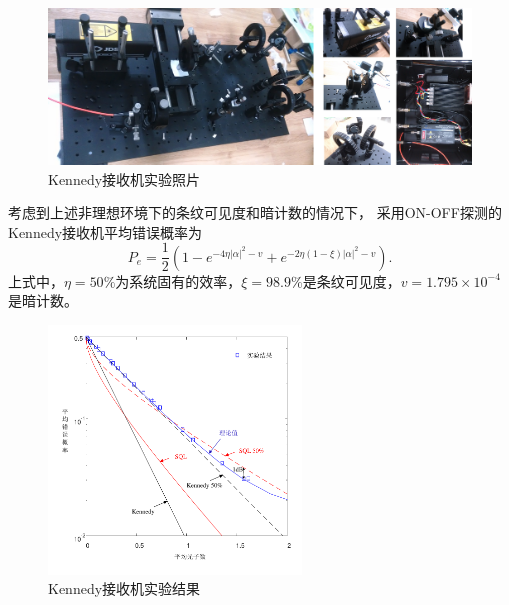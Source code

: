 \begin{figure}
\centering
  \includegraphics[width=\textwidth]{figures/chap5/experiment-photo}
  \caption{Kennedy接收机实验照片}
  \label{fig:experiment-photo}
\end{figure}

考虑到上述非理想环境下的条纹可见度和暗计数的情况下，
采用ON-OFF探测的Kennedy接收机平均错误概率为
\begin{equation}
P_e = \frac{1}{2}(1-e^{- 4 \eta |\alpha|^2 - v} + e^{- 2 \eta (1-\xi) |\alpha|^2 - v }).
\end{equation}
上式中，$\eta=50\%$为系统固有的效率，$\xi=98.9\%$是条纹可见度，$v=1.795\times 10^{-4}$是暗计数。

\begin{figure} %
\centering
  \includegraphics[width=0.6\textwidth]{figures/chap5/kennedy-experiment-error}
  \caption{Kennedy接收机实验结果}
  \label{fig:kennedy-experiment-error}
\end{figure}

